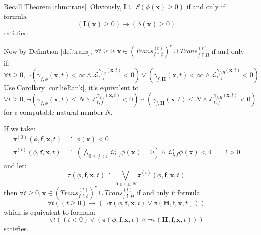 \documentclass{article}
\begin{document}
\begin{Proof}
Recall Theorem \ref{thm:trans}. Obviously, $\boldsymbol{I} \subseteq S(\phi(\boldsymbol{x}) \geq 0)$ if and only if formula
	\begin{equation*}
		(\boldsymbol{I}(\boldsymbol{x}) \geq 0) \rightarrow (\phi(\boldsymbol{x}) \geq 0)
	\end{equation*}
satisfies.

Now by Definition \ref{def:trans}, $\forall t \geq 0, \boldsymbol{x} \in (Trans_{f \uparrow \phi}^{(t)})^c \cup Trans_{f \uparrow H}^{(t)}$ if and only if:
	\begin{equation*}
		\forall t \geq 0, \neg(\gamma_{f, \phi}(\boldsymbol{x}, t) < \infty \wedge \mathcal{L}_{t, f}^{\gamma_{f, \phi}(\boldsymbol{x}, t)} < 0) \vee (\gamma_{f, \boldsymbol{H}}(\boldsymbol{x}, t) < \infty \wedge \mathcal{L}_{t, f}^{\gamma_{f, H}(\boldsymbol{x}, t)} <0)
	\end{equation*}
Use Corollary \ref{cor:lieRank}, it's equivalent to:
	\begin{equation*}
		\forall t \geq 0, \neg(\gamma_{f, \phi}(\boldsymbol{x}, t) \leq N \wedge \mathcal{L}_{t, f}^{\gamma_{f, \phi}(\boldsymbol{x}, t)} < 0) \vee (\gamma_{f, \boldsymbol{H}}(\boldsymbol{x}, t) \leq N \wedge \mathcal{L}_{t, f}^{\gamma_{f, H}(\boldsymbol{x}, t)} <0)
	\end{equation*}
for a computable natural number $N$.

If we take:
	\begin{align*}
		\pi^{(0)}(\phi, \boldsymbol{f}, \boldsymbol{x}, t) &\doteq \phi(\boldsymbol{x}) < 0 \\
		\pi^{(i)}(\phi, \boldsymbol{f}, \boldsymbol{x}, t) &\doteq (\bigwedge_{0 \leq j < i} \mathcal{L}_{t, f}^j \phi(\boldsymbol{x}) = 0) \wedge \mathcal{L}_{t, f}^i \phi(\boldsymbol{x}) < 0 \qquad i > 0
	\end{align*}
and let:
	\begin{equation*}
		\pi(\phi, \boldsymbol{f}, \boldsymbol{x}, t) \doteq \bigvee_{0 \leq i \leq N} \pi^{(i)}(\phi, \boldsymbol{f}, \boldsymbol{x}, t)
	\end{equation*}
then $\forall t \geq 0, \boldsymbol{x} \in (Trans_{f \uparrow \phi}^{(t)})^c \cup Trans_{f \uparrow H}^{(t)}$ if and only if formula
	\begin{equation*}
		\forall t ((t \geq 0) \rightarrow (\neg \pi(\phi, \boldsymbol{f}, \boldsymbol{x}, t) \vee \pi(\boldsymbol{H}, \boldsymbol{f}, \boldsymbol{x}, t)))
	\end{equation*}
which is equivalent to formula:
	\begin{equation*}
		\forall t ((t < 0) \vee (\pi(\phi, \boldsymbol{f}, \boldsymbol{x}, t) \wedge \neg \pi(\boldsymbol{H}, \boldsymbol{f}, \boldsymbol{x}, t)))
	\end{equation*}
satisfies.


\end{Proof}
\end{document}
